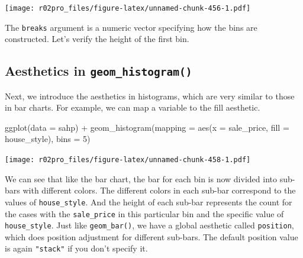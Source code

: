 \documentclass[
]{book}
\newenvironment{Shaded}{\begin{snugshade}}{\end{snugshade}}
\newcommand{\AttributeTok}[1]{\textcolor[rgb]{0.77,0.63,0.00}{#1}}
\newcommand{\CommentTok}[1]{\textcolor[rgb]{0.56,0.35,0.01}{\textit{#1}}}
\newcommand{\DecValTok}[1]{\textcolor[rgb]{0.00,0.00,0.81}{#1}}
\newcommand{\FunctionTok}[1]{\textcolor[rgb]{0.00,0.00,0.00}{#1}}
\newcommand{\NormalTok}[1]{#1}
\newcommand{\SpecialCharTok}[1]{\textcolor[rgb]{0.00,0.00,0.00}{#1}}
\begin{document}
\texttt{[image: r02pro\_files/figure-latex/unnamed-chunk-456-1.pdf]}

The \texttt{breaks} argument is a numeric vector specifying how the bins are constructed. Let's verify the height of the first bin.

\begin{Shaded}
\end{Shaded}

\hypertarget{aesthetics-in-geom_histogram}{%
\subsection{\texorpdfstring{Aesthetics in \texttt{geom\_histogram()}}{Aesthetics in geom\_histogram()}}\label{aesthetics-in-geom_histogram}}

Next, we introduce the aesthetics in histograms, which are very similar to those in bar charts. For example, we can map a variable to the fill aesthetic.

\begin{Shaded}
\begin{Highlighting}[]
\FunctionTok{ggplot}\NormalTok{(}\AttributeTok{data =}\NormalTok{ sahp) }\SpecialCharTok{+} \FunctionTok{geom\_histogram}\NormalTok{(}\AttributeTok{mapping =} \FunctionTok{aes}\NormalTok{(}\AttributeTok{x =}\NormalTok{ sale\_price, }\AttributeTok{fill =}\NormalTok{ house\_style), }\AttributeTok{bins =} \DecValTok{5}\NormalTok{)}
\end{Highlighting}
\end{Shaded}

\texttt{[image: r02pro\_files/figure-latex/unnamed-chunk-458-1.pdf]}

We can see that like the bar chart, the bar for each bin is now divided into sub-bars with different colors. The different colors in each sub-bar correspond to the values of \texttt{house\_style}. And the height of each sub-bar represents the count for the cases with the \texttt{sale\_price} in this particular bin and the specific value of \texttt{house\_style}. Just like \texttt{geom\_bar()}, we have a global aesthetic called \texttt{position}, which does position adjustment for different sub-bars. The default position value is again \texttt{"stack"} if you don't specify it.
\end{document}

